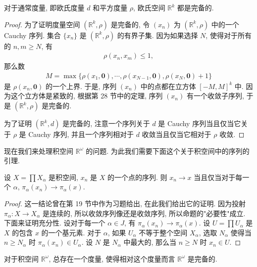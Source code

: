\documentclass[../../main.tex]{subfiles}
\begin{document}
\begin{theorem}\label{theorem:ch07-euclidean-complete}
对于通常度量, 即欧氏度量 $d$ 和平方度量 $\rho$, 欧氏空间 $\mathbb{R}^k$ 都是完备的.
\end{theorem}

\begin{proof}
为了证明度量空间 $(\mathbb{R}^k,\rho)$ 是完备的, 令 $(x_n)$ 为 $(\mathbb{R}^k,\rho)$ 中的一个 Cauchy 序列. 集合 $\{x_n\}$ 是 $(\mathbb{R}^k,\rho)$ 的有界子集. 因为如果选择 $N$, 使得对于所有的 $n,m\geqslant N$, 有
\begin{align*}
\rho(x_n,x_m)\leqslant 1,
\end{align*}
那么数
\begin{align*}
M=\max\{\rho(x_1,\mathbf{0}),\cdots,\rho(x_{N-1},\mathbf{0}),\rho(x_N,\mathbf{0})+1\}
\end{align*}
是 $\rho(x_n,\mathbf{0})$ 的一个上界. 于是, 序列 $(x_n)$ 中的点都在立方体 $[-M,M]^k$ 中. 因为这个立方体是紧致的, 根据第 28 节中的定理, 序列 $(x_n)$ 有一个收敛子序列, 于是 $(\mathbb{R}^k,\rho)$ 是完备的.

为了证明 $(\mathbb{R}^k,d)$ 是完备的, 注意一个序列关于 $d$ 是 Cauchy 序列当且仅当它关于 $\rho$ 是 Cauchy 序列, 并且一个序列相对于 $d$ 收敛当且仅当它相对于 $\rho$ 收敛.
\end{proof}

现在我们来处理积空间 $\mathbb{R}^\omega$ 的问题. 为此我们需要下面这个关于积空间中的序列的引理.

\begin{lemma}\label{lemma:ch07-product-sequence}
设 $X=\prod X_\alpha$ 是积空间, $x_n$ 是 $X$ 的一个点的序列. 则 $x_n\to x$ 当且仅当对于每一个 $\alpha$, $\pi_\alpha(x_n)\to\pi_\alpha(x)$.
\end{lemma}

\begin{proof}
这一结论曾在第 19 节中作为习题给出, 在此我们给出它的证明. 因为投射 $\pi_\alpha\colon X\to X_\alpha$ 是连续的, 所以收敛序列像还是收敛序列, 所以命题的"必要性"成立. 下面来证明充分性. 设对于每一个 $\alpha\in J$, 有 $\pi_\alpha(x_n)\to\pi_\alpha(x)$. 设 $U=\prod U_\alpha$ 是 $X$ 的包含 $x$ 的一个基元素. 对于 $\alpha$, 如果 $U_\alpha$ 不等于整个空间 $X_\alpha$, 选取 $N_\alpha$ 使得当 $n\geqslant N_\alpha$ 时 $\pi_\alpha(x_n)\in U_\alpha$. 设 $N$ 是 $N_\alpha$ 中最大的, 那么当 $n\geqslant N$ 时 $x_n\in U$.
\end{proof}

\begin{theorem}\label{theorem:ch07-Romega-complete}
对于积空间 $\mathbb{R}^\omega$, 总存在一个度量, 使得相对这个度量而言 $\mathbb{R}^\omega$ 是完备的.
\end{theorem}
\end{document}
